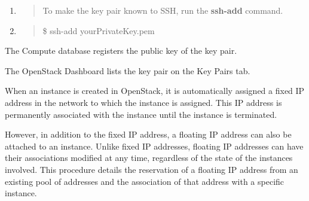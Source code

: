 \begin{enumerate}
\def\labelenumi{\arabic{enumi}.}
\item
  \begin{quote}
  To make the key pair known to SSH, run the \textbf{ssh-add} command.
  \end{quote}
\item
  \begin{quote}
  \$ ssh-add yourPrivateKey.pem
  \end{quote}
\end{enumerate}

The Compute database registers the public key of the key pair.

The \gls{OpenStack Dashboard} lists the key pair on the Key Pairs tab.

\label{allocate-a-floating-ip-address-to-an-instance}

When an instance is created in \gls{OpenStack}, it is automatically assigned a
fixed IP address in the network to which the instance is assigned. This
IP address is permanently associated with the instance until the
instance is terminated.

However, in addition to the fixed IP address, a floating IP address can
also be attached to an instance. Unlike fixed IP addresses, floating IP
addresses can have their associations modified at any time, regardless
of the state of the instances involved. This procedure details the
reservation of a floating IP address from an existing pool of addresses
and the association of that address with a specific instance.

